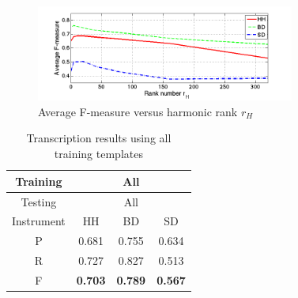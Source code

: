 \documentclass{article}
\begin{document}
\begin{figure}
 \centerline{
 \includegraphics[width=8.5cm]{rankTest.png}}
 \caption{Average F-measure versus harmonic rank $r_{H}$}%
 \label{fig:rankTest}
\end{figure}

\begin{table}[ht]
\begin{footnotesize}
\begin{center}
\begin{tabular}{|c|c|c|c|}
\hline
Training   & \multicolumn{3}{c|}{All}                         \\ \hline
Testing    & \multicolumn{3}{c|}{All}                         \\ \hline
Instrument & HH             & BD             & SD             \\ \hline
P          & 0.681          & 0.755          & 0.634          \\ \hline
R          & 0.727          & 0.827          & 0.513          \\ \hline
F          & \textbf{0.703} & \textbf{0.789} & \textbf{0.567} \\ \hline
\end{tabular}
\end{center}
\caption{Transcription results using all training templates}
\label{tab:basicResults}
\end{footnotesize}
\end{table}
  
\end{document}
